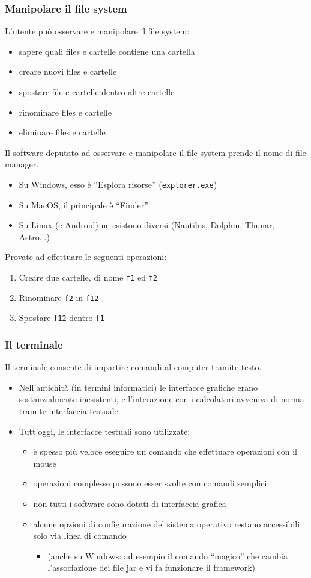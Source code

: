\documentclass{beamer}
\begin{document}
\begin{frame}[fragile]
\frametitle{Manipolare il file system}
L'utente può osservare e manipolare il file system:
\begin{itemize}
 \item sapere quali files e cartelle contiene una cartella
 \item creare nuovi files e cartelle
 \item spostare file e cartelle dentro altre cartelle
 \item rinominare files e cartelle
 \item eliminare files e cartelle
\end{itemize}
Il software deputato ad osservare e manipolare il file system prende il nome di file manager.
\begin{itemize}
 \item Su Windows, esso è ``Esplora risorse'' (\texttt{explorer.exe})
 \item Su MacOS, il principale è ``Finder''
 \item Su Linux (e Android) ne esistono diversi (Nautilus, Dolphin, Thunar, Astro...)
\end{itemize}
Provate ad effettuare le seguenti operazioni:
\begin{enumerate}
 \item Creare due cartelle, di nome \texttt{f1} ed \texttt{f2}
 \item Rinominare \texttt{f2} in \texttt{f12}
 \item Spostare \texttt{f12} dentro \texttt{f1}
\end{enumerate}
\end{frame}

\begin{frame}[fragile]
\frametitle{Il terminale}
Il terminale consente di impartire comandi al computer tramite testo.
\begin{itemize}
 \item Nell'antichità (in termini informatici) le interfacce grafiche erano sostanzialmente inesistenti, e l'interazione con i calcolatori avveniva di norma tramite interfaccia testuale
 \item Tutt'oggi, le interfacce testuali sono utilizzate:
\begin{itemize}
 \item è spesso più veloce eseguire un comando che effettuare operazioni con il mouse
 \item operazioni complesse possono esser svolte con comandi semplici
 \item non tutti i software sono dotati di interfaccia grafica
 \item alcune opzioni di configurazione del sistema operativo restano accessibili solo via linea di comando
\begin{itemize}
 \item (anche su Windows: ad esempio il comando ``magico'' che cambia l'associazione dei file jar e vi fa funzionare il framework)
\end{itemize}
\end{itemize}
\end{itemize}
\end{frame}
\end{document}
